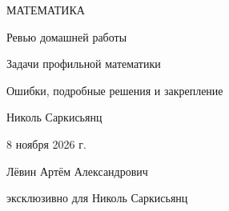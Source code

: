 \documentclass[a4paper,12pt]{article}
\begin{document}
\thispagestyle{empty}
\begin{center}
\vspace*{25mm}
{\small\color{darkaccent}\MakeUppercase{Математика}}\par
\vspace{22mm}
{\LARGE Ревью домашней работы}\par
\vspace{13mm}
{\Large\color{accent} Задачи профильной математики}\par
\vspace{5mm}
{\normalsize\color{quiet} Ошибки, подробные решения и закрепление}\par
\vspace{43mm}
{\large Николь Саркисьянц}\par
\vspace{12mm}
{8 ноября 2026 г.}\par
\vfill
{\small Лёвин Артём Александрович}\par
{\small эксклюзивно для Николь Саркисьянц}\par
\vspace{19mm}
\end{center}
\clearpage
\end{document}
